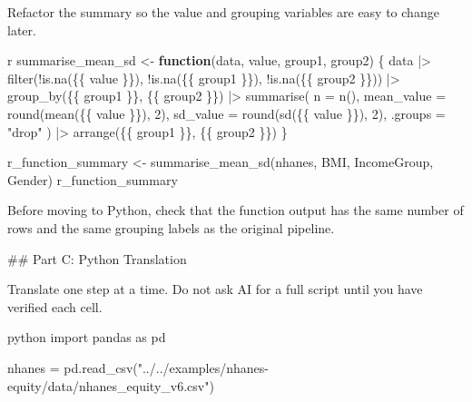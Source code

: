 \documentclass[
  letterpaper,
  DIV=11,
  numbers=noendperiod,
  oneside]{scrreprt}
\newenvironment{Shaded}{\begin{snugshade}}{\end{snugshade}}
\newcommand{\AttributeTok}[1]{\textcolor[rgb]{0.40,0.45,0.13}{#1}}
\newcommand{\ControlFlowTok}[1]{\textcolor[rgb]{0.00,0.23,0.31}{\textbf{#1}}}
\newcommand{\DecValTok}[1]{\textcolor[rgb]{0.68,0.00,0.00}{#1}}
\newcommand{\FunctionTok}[1]{\textcolor[rgb]{0.28,0.35,0.67}{#1}}
\newcommand{\ImportTok}[1]{\textcolor[rgb]{0.00,0.46,0.62}{#1}}
\newcommand{\InformationTok}[1]{\textcolor[rgb]{0.37,0.37,0.37}{#1}}
\newcommand{\NormalTok}[1]{\textcolor[rgb]{0.00,0.23,0.31}{#1}}
\newcommand{\OperatorTok}[1]{\textcolor[rgb]{0.37,0.37,0.37}{#1}}
\newcommand{\OtherTok}[1]{\textcolor[rgb]{0.00,0.23,0.31}{#1}}
\newcommand{\SpecialCharTok}[1]{\textcolor[rgb]{0.37,0.37,0.37}{#1}}
\newcommand{\StringTok}[1]{\textcolor[rgb]{0.13,0.47,0.30}{#1}}
\begin{document}
\begin{Shaded}
\begin{Highlighting}[numbers=left,,]
\NormalTok{Refactor the summary so the value and grouping variables are easy to change later.}

\InformationTok{\textasciigrave{}\textasciigrave{}\textasciigrave{}r}
\NormalTok{summarise\_mean\_sd }\OtherTok{\textless{}{-}} \ControlFlowTok{function}\NormalTok{(data, value, group1, group2) \{}
\NormalTok{  data }\SpecialCharTok{|\textgreater{}}
    \FunctionTok{filter}\NormalTok{(}\SpecialCharTok{!}\FunctionTok{is.na}\NormalTok{(\{\{ value \}\}), }\SpecialCharTok{!}\FunctionTok{is.na}\NormalTok{(\{\{ group1 \}\}), }\SpecialCharTok{!}\FunctionTok{is.na}\NormalTok{(\{\{ group2 \}\})) }\SpecialCharTok{|\textgreater{}}
    \FunctionTok{group\_by}\NormalTok{(\{\{ group1 \}\}, \{\{ group2 \}\}) }\SpecialCharTok{|\textgreater{}}
    \FunctionTok{summarise}\NormalTok{(}
      \AttributeTok{n =} \FunctionTok{n}\NormalTok{(),}
      \AttributeTok{mean\_value =} \FunctionTok{round}\NormalTok{(}\FunctionTok{mean}\NormalTok{(\{\{ value \}\}), }\DecValTok{2}\NormalTok{),}
      \AttributeTok{sd\_value =} \FunctionTok{round}\NormalTok{(}\FunctionTok{sd}\NormalTok{(\{\{ value \}\}), }\DecValTok{2}\NormalTok{),}
      \AttributeTok{.groups =} \StringTok{"drop"}
\NormalTok{    ) }\SpecialCharTok{|\textgreater{}}
    \FunctionTok{arrange}\NormalTok{(\{\{ group1 \}\}, \{\{ group2 \}\})}
\NormalTok{\}}

\NormalTok{r\_function\_summary }\OtherTok{\textless{}{-}} \FunctionTok{summarise\_mean\_sd}\NormalTok{(nhanes, BMI, IncomeGroup, Gender)}
\NormalTok{r\_function\_summary}
\InformationTok{\textasciigrave{}\textasciigrave{}\textasciigrave{}}

\NormalTok{Before moving to Python, check that the function output has the same number of rows and the same grouping labels as the original pipeline.}

\FunctionTok{\#\# Part C: Python Translation}

\NormalTok{Translate one step at a time. Do not ask AI for a full script until you have verified each cell.}

\InformationTok{\textasciigrave{}\textasciigrave{}\textasciigrave{}python}
\ImportTok{import}\NormalTok{ pandas }\ImportTok{as}\NormalTok{ pd}

\NormalTok{nhanes }\OperatorTok{=}\NormalTok{ pd.read\_csv(}\StringTok{"../../examples/nhanes{-}equity/data/nhanes\_equity\_v6.csv"}\NormalTok{)}


\end{Highlighting}
\end{Shaded}
\end{document}

